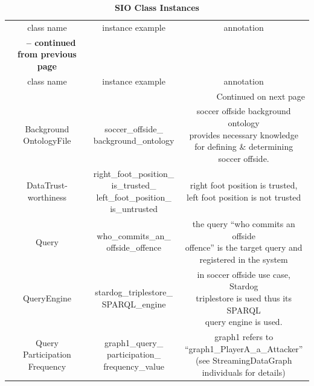 \begin{center}
\begin{longtable}{|c||c||c|}
	\caption{\textbf{SIO Class Instances}} \label{tab:app-gi} \\
	\hline \multicolumn{1}{|c||}{class name} & \multicolumn{1}{c||}{instance example} & \multicolumn{1}{c|}{annotation} \\ \hhline{|=#=#=|}
	\endfirsthead
	\multicolumn{3}{c}%
	{{\bfseries \tablename\ \thetable{} -- continued from previous page}} \\
	\hline \multicolumn{1}{|c||}{class name} &
	\multicolumn{1}{c||}{instance example} &
	\multicolumn{1}{c|}{annotation} \\ \hline 
	\endhead
	\hline \multicolumn{3}{|r|}{{Continued on next page}} \\ \hline
	\endfoot
	\hline
	\endlastfoot
	\makecell{Background\\OntologyFile} & \makecell{soccer\_offside\_\\background\_ontology} & \makecell[l]{soccer offside background ontology \\ provides necessary knowledge \\ for defining \& determining \\soccer offside.} \\ \hline
	\makecell{DataTrust-\\worthiness} & \makecell{right\_foot\_position\_\\is\_trusted\_\\left\_foot\_position\_\\is\_untrusted} & \makecell[l]{right foot position is trusted, \\left foot position is not trusted} \\ \hline
	Query & \makecell{who\_commits\_an\_\\offside\_offence} & \makecell[l]{the query ``who commits an offside \\offence'' is the target query and \\registered in the system} \\ \hline
	QueryEngine & \makecell{stardog\_triplestore\_\\SPARQL\_engine} & \makecell[l]{in soccer offside use case, Stardog \\triplestore is used thus its SPARQL \\query engine is used.} \\ \hline
	\makecell{Query\\Participation\\Frequency} & \makecell{graph1\_query\_\\participation\_\\frequency\_value} & \makecell[l]{graph1 refers to\\``graph1\_PlayerA\_a\_Attacker''\\ (see StreamingDataGraph \\individuals for details)} \\ \hline

\end{longtable}
\end{center}
